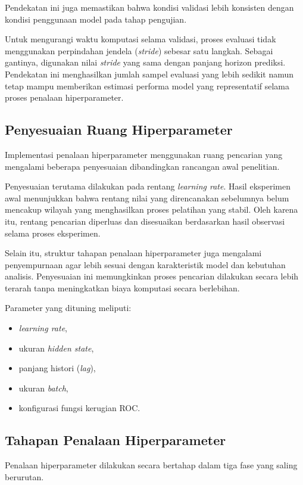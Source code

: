 Pendekatan ini juga memastikan bahwa kondisi validasi lebih konsisten dengan kondisi penggunaan model pada tahap pengujian.

Untuk mengurangi waktu komputasi selama validasi, proses evaluasi tidak menggunakan perpindahan jendela (\textit{stride}) sebesar satu langkah. Sebagai gantinya, digunakan nilai \textit{stride} yang sama dengan panjang horizon prediksi. Pendekatan ini menghasilkan jumlah sampel evaluasi yang lebih sedikit namun tetap mampu memberikan estimasi performa model yang representatif selama proses penalaan hiperparameter.

\subsection{Penyesuaian Ruang Hiperparameter}

Implementasi penalaan hiperparameter menggunakan ruang pencarian yang mengalami beberapa penyesuaian dibandingkan rancangan awal penelitian.

Penyesuaian terutama dilakukan pada rentang \textit{learning rate}. Hasil eksperimen awal menunjukkan bahwa rentang nilai yang direncanakan sebelumnya belum mencakup wilayah yang menghasilkan proses pelatihan yang stabil. Oleh karena itu, rentang pencarian diperluas dan disesuaikan berdasarkan hasil observasi selama proses eksperimen.

Selain itu, struktur tahapan penalaan hiperparameter juga mengalami penyempurnaan agar lebih sesuai dengan karakteristik model dan kebutuhan analisis. Penyesuaian ini memungkinkan proses pencarian dilakukan secara lebih terarah tanpa meningkatkan biaya komputasi secara berlebihan.

Parameter yang dituning meliputi:

\begin{itemize}
\item \textit{learning rate},
\item ukuran \textit{hidden state},
\item panjang histori (\textit{lag}),
\item ukuran \textit{batch},
\item konfigurasi fungsi kerugian ROC.
\end{itemize}

\subsection{Tahapan Penalaan Hiperparameter}

Penalaan hiperparameter dilakukan secara bertahap dalam tiga fase yang saling berurutan.

